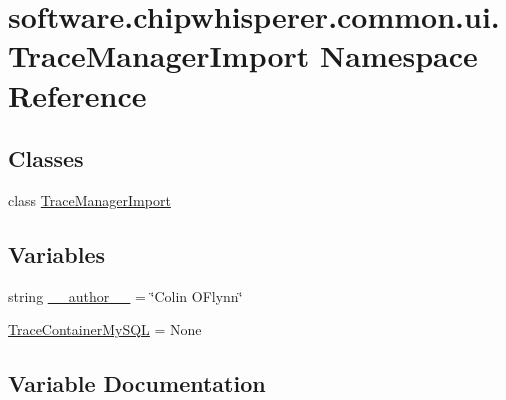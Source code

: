 \hypertarget{namespacesoftware_1_1chipwhisperer_1_1common_1_1ui_1_1TraceManagerImport}{}\section{software.\+chipwhisperer.\+common.\+ui.\+Trace\+Manager\+Import Namespace Reference}
\label{namespacesoftware_1_1chipwhisperer_1_1common_1_1ui_1_1TraceManagerImport}
\subsection*{Classes}
\begin{DoxyCompactItemize}
\item 
class \hyperlink{classsoftware_1_1chipwhisperer_1_1common_1_1ui_1_1TraceManagerImport_1_1TraceManagerImport}{Trace\+Manager\+Import}
\end{DoxyCompactItemize}
\subsection*{Variables}
\begin{DoxyCompactItemize}
\item 
string \hyperlink{namespacesoftware_1_1chipwhisperer_1_1common_1_1ui_1_1TraceManagerImport_acbcd69c931723baa213fcb879dddd2c6}{\+\_\+\+\_\+author\+\_\+\+\_\+} = \char`\"{}Colin O\textquotesingle{}Flynn\char`\"{}
\item 
\hyperlink{namespacesoftware_1_1chipwhisperer_1_1common_1_1ui_1_1TraceManagerImport_aee86f0dc8c76de831cf8c9428cdd2ff4}{Trace\+Container\+My\+S\+Q\+L} = None
\end{DoxyCompactItemize}


\subsection{Variable Documentation}
\hypertarget{namespacesoftware_1_1chipwhisperer_1_1common_1_1ui_1_1TraceManagerImport_acbcd69c931723baa213fcb879dddd2c6}{}
